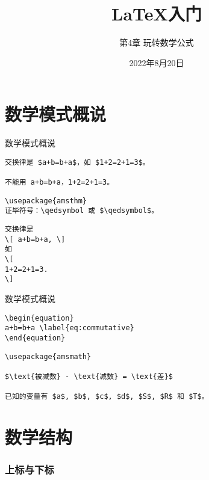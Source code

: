 \documentclass[11pt]{beamer}
\begin{document}
	\title{\LaTeX 入门}
	\subtitle{第4章 玩转数学公式}
	\date{2022年8月20日}
	\begin{frame}[plain]
		\maketitle
	\end{frame}
	
\part{数学模式概说}	

\begin{frame}[fragile]{数学模式概说}
\begin{lstlisting}
交换律是 $a+b=b+a$，如 $1+2=2+1=3$。

不能用 a+b=b+a，1+2=2+1=3。
\end{lstlisting}
\begin{lstlisting}
\usepackage{amsthm}
证毕符号：\qedsymbol 或 $\qedsymbol$。
\end{lstlisting}
\begin{lstlisting}
交换律是
\[ a+b=b+a, \]
如
\[
1+2=2+1=3.
\]
\end{lstlisting}
\end{frame}

\begin{frame}[fragile]{数学模式概说}
\begin{lstlisting}
\begin{equation}
a+b=b+a \label{eq:commutative}
\end{equation}
\end{lstlisting}
\begin{lstlisting}
\usepackage{amsmath}

$\text{被减数} - \text{减数} = \text{差}$

已知的变量有 $a$, $b$, $c$, $d$, $S$, $R$ 和 $T$。
\end{lstlisting}
\end{frame}

\part{数学结构}
\section{上标与下标}
\end{document}
